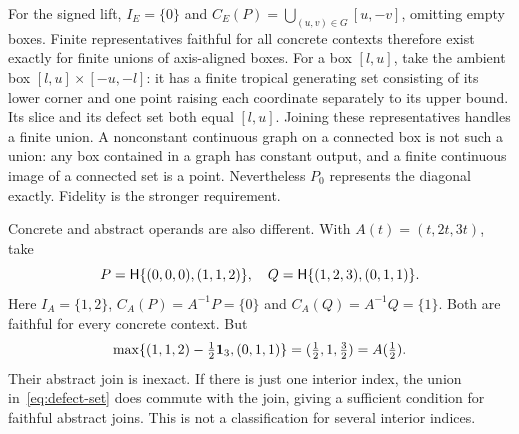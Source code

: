 For the signed lift, $I_E=\{0\}$ and $C_E(P)=\bigcup_{(u,v)\in G}[u,-v]$, omitting empty boxes. Finite representatives faithful for all concrete contexts therefore exist exactly for finite unions of axis-aligned boxes. For a box $[l,u]$, take the ambient box $[l,u]\times[-u,-l]$: it has a finite tropical generating set consisting of its lower corner and one point raising each coordinate separately to its upper bound. Its slice and its defect set both equal $[l,u]$. Joining these representatives handles a finite union. A nonconstant continuous graph on a connected box is not such a union: any box contained in a graph has constant output, and a finite continuous image of a connected set is a point. Nevertheless $P_0$ represents the diagonal exactly. Fidelity is the stronger requirement.

Concrete and abstract operands are also different. With $A(t)=(t,2t,3t)$, take
\[
P=\mathsf H\{(0,0,0),(1,1,2)\},\quad
Q=\mathsf H\{(1,2,3),(0,1,1)\}.
\]
Here $I_A=\{1,2\}$, $C_A(P)=A^{-1}P=\{0\}$ and $C_A(Q)=A^{-1}Q=\{1\}$. Both are faithful for every concrete context. But
\[
\max\{(1,1,2)-\tfrac12\mathbf 1_3,(0,1,1)\}
=(\tfrac12,1,\tfrac32)=A(\tfrac12).
\]
Their abstract join is inexact. If there is just one interior index, the union in~\eqref{eq:defect-set} does commute with the join, giving a sufficient condition for faithful abstract joins. This is not a classification for several interior indices.
